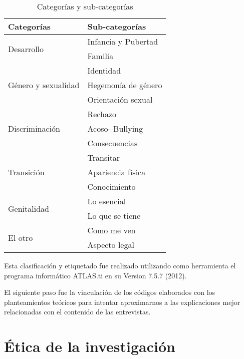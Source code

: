 \begin{table}[h]
\centering
\caption{Categorías y sub-categorías}\label{tab:categorias}
\begin{tabularx}{0.7\textwidth}{@{}XX@{}}
\toprule
Categorías                           & Sub-categorías      \\ \midrule
\multirow{2}{*}{Desarrollo}          & Infancia y Pubertad \\
                                     & Familia             \\ \midrule
\multirow{3}{*}{Género y sexualidad} & Identidad           \\
                                     & Hegemonía de género \\
                                     & Orientación sexual  \\ \midrule
\multirow{3}{*}{Discriminación}      & Rechazo             \\
                                     & Acoso- Bullying     \\
                                     & Consecuencias       \\ \midrule
\multirow{3}{*}{Transición}          & Transitar           \\
                                     & Apariencia física   \\
                                     & Conocimiento        \\ \midrule
\multirow{2}{*}{Genitalidad}         & Lo esencial         \\
                                     & Lo que se tiene     \\ \midrule
\multirow{2}{*}{El otro}             & Como me ven         \\
                                     & Aspecto legal       \\ \bottomrule
\end{tabularx}
\end{table}

Esta clasificación y etiquetado fue realizado utilizando como herramienta el
programa informático ATLAS.ti en su Version 7.5.7 (2012)\@.

El siguiente paso fue la vinculación de los códigos elaborados con los
planteamientos teóricos para intentar aproximarnos a las explicaciones mejor
relacionadas con el contenido de las entrevistas.

\section{Ética de la investigación}

